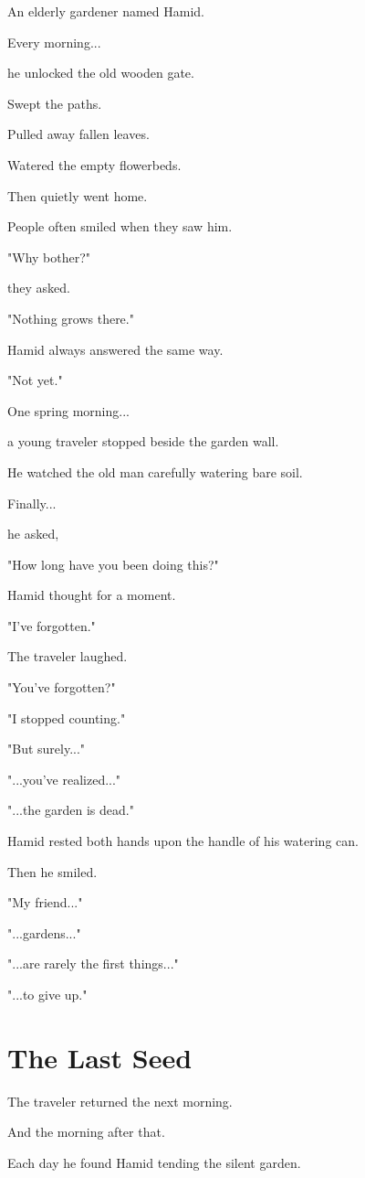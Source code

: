 \documentclass[12pt,openany]{book}
\begin{document}
An elderly gardener named Hamid.

Every morning...

he unlocked the old wooden gate.

Swept the paths.

Pulled away fallen leaves.

Watered the empty flowerbeds.

Then quietly went home.

People often smiled when they saw him.

"Why bother?"

they asked.

"Nothing grows there."

Hamid always answered the same way.

"Not yet."

One spring morning...

a young traveler stopped beside the garden wall.

He watched the old man carefully watering bare soil.

Finally...

he asked,

"How long have you been doing this?"

Hamid thought for a moment.

"I've forgotten."

The traveler laughed.

"You've forgotten?"

"I stopped counting."

"But surely..."

"...you've realized..."

"...the garden is dead."

Hamid rested both hands upon the handle of his watering can.

Then he smiled.

"My friend..."

"...gardens..."

"...are rarely the first things..."

"...to give up."
\section*{The Last Seed}

The traveler returned the next morning.

And the morning after that.

Each day he found Hamid tending the silent garden.
\end{document}

